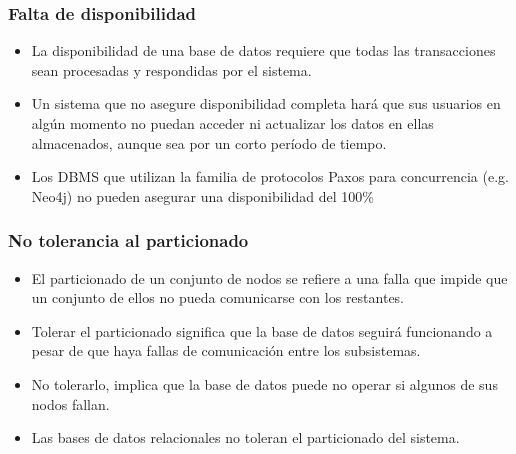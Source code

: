 \begin{frame}
\frametitle{Falta de disponibilidad}
\begin{itemize}

	\item	La disponibilidad de una base de datos requiere que todas las transacciones sean procesadas y respondidas por el sistema. \pause
	\item	Un sistema que no asegure disponibilidad completa hará que sus usuarios en algún momento no puedan acceder ni actualizar los datos en ellas almacenados, aunque sea por un corto período de tiempo.
	\item	Los DBMS que utilizan la familia de protocolos Paxos para concurrencia (e.g. Neo4j) no pueden asegurar una disponibilidad del 100\%

\end{itemize}
\end{frame}

\begin{frame}
\frametitle{No tolerancia al particionado}
\begin{itemize}

	\item	El particionado de un conjunto de nodos se refiere a una falla que impide que un conjunto de ellos no pueda comunicarse con los restantes. \pause
	\item	Tolerar el particionado significa que la base de datos seguirá funcionando a pesar de que haya fallas de comunicación entre los subsistemas. \pause
	\item	No tolerarlo, implica que la base de datos puede no operar si algunos de sus nodos fallan. \pause
	\item	Las bases de datos relacionales no toleran el particionado del sistema.
	
\end{itemize}
\end{frame}

